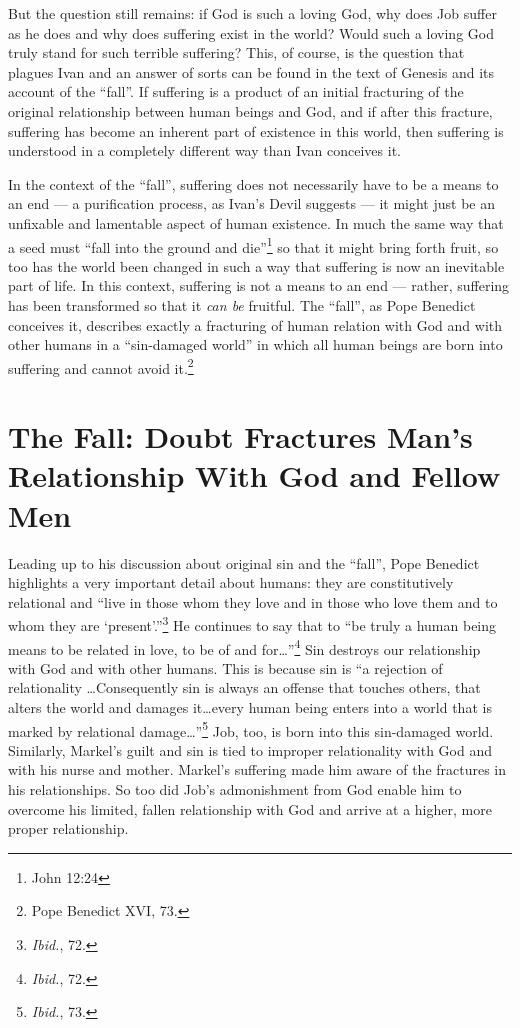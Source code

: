 But the question still remains: if God is such a loving God, why does Job suffer as he does and why does suffering exist in the world? Would such a loving God truly stand for such terrible suffering? This, of course, is the question that plagues Ivan and an answer of sorts can be found in the text of Genesis and its account of the ``fall''. If suffering is a product of an initial fracturing of the original relationship between human beings and God, and if after this fracture, suffering has become an inherent part of existence in this world, then suffering is understood in a completely different way than Ivan conceives it. 

In the context of the ``fall'', suffering does not necessarily have to be a means to an end --- a purification process, as Ivan's Devil suggests --- it might just be an unfixable and lamentable aspect of human existence. In much the same way that a seed must ``fall into the ground and die''\footnote{John 12:24} so that it might bring forth fruit, so too has the world been changed in such a way that suffering is now an inevitable part of life. In this context, suffering is not a means to an end --- rather, suffering has been transformed so that it \emph{can be} fruitful. The ``fall'', as Pope Benedict conceives it, describes exactly a fracturing of human relation with God and with other humans in a ``sin-damaged world'' in which all human beings are born into suffering and cannot avoid it.\footnote{Pope Benedict XVI, 73.}

\section{The Fall: Doubt Fractures Man's Relationship With God and Fellow Men}
Leading up to his discussion about original sin and the ``fall'', Pope Benedict highlights a very important detail about humans: they are constitutively relational and ``live in those whom they love and in those who love them and to whom they are `present'.\thinspace''\footnote{\emph{Ibid.}, 72.} He continues to say that to ``be truly a human being means to be related in love, to be of and for\ldots''\footnote{\emph{Ibid.}, 72.} Sin destroys our relationship with God and with other humans. This is because sin is ``a rejection of relationality \ldots Consequently sin is always an offense that touches others, that alters the world and damages it\ldots every human being enters into a world that is marked by relational damage\ldots''\footnote{\emph{Ibid.}, 73.} Job, too, is born into this sin-damaged world. Similarly, Markel's guilt and sin is tied to improper relationality with God and with his nurse and mother. Markel's suffering made him aware of the fractures in his relationships. So too did Job's admonishment from God enable him to overcome his limited, fallen relationship with God and arrive at a higher, more proper relationship. 

